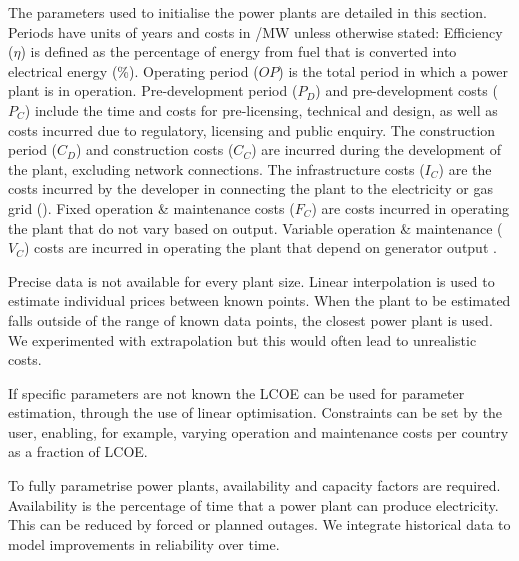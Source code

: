 The parameters used to initialise the power plants are detailed in this section. Periods have units of years and costs in \textsterling/MW unless otherwise stated: Efficiency ($\eta$) is defined as the percentage of energy from fuel that is converted into electrical energy (\%). Operating period ($OP$) is the total period in which a power plant is in operation. Pre-development period ($P_D$) and pre-development costs ($P_C$) include the time and costs for pre-licensing, technical and design, as well as costs incurred due to regulatory, licensing and public enquiry. The construction period ($C_D$) and construction costs ($C_C$) are incurred during the development of the plant, excluding network connections. The infrastructure costs ($I_C$) are the costs incurred by the developer in connecting the plant to the electricity or gas grid (\textsterling). Fixed operation \& maintenance costs ($F_C$) are costs incurred in operating the plant that do not vary based on output. Variable operation \& maintenance ($V_C$) costs are incurred in operating the plant that depend on generator output \cite{Ltd2016}.




Precise data is not available for every plant size. Linear interpolation is used to estimate individual prices between known points. When the plant to be estimated falls outside of the range of known data points, the closest power plant is used. We experimented with extrapolation but this would often lead to unrealistic costs. %

If specific parameters are not known the LCOE can be used for parameter estimation, through the use of linear optimisation. Constraints can be set by the user, enabling, for example, varying operation and maintenance costs per country as a fraction of LCOE.

To fully parametrise power plants, availability and capacity factors are required. Availability is the percentage of time that a power plant can produce electricity. This can be reduced by forced or planned outages. We integrate historical data to model improvements in reliability over time.

